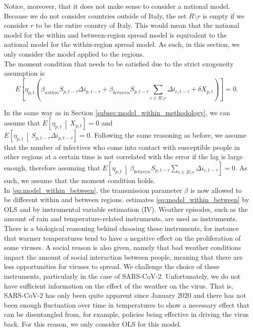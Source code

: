 \documentclass[12pt]{article}
\begin{document}
	Notice, moreover, that it does not make sense to consider a national model. Because we do not consider countries outside of Italy, the set $R \setminus r$ is empty if we consider $r$ to be the entire country of Italy. This would mean that the national model for the within and between-region spread model is equivalent to the national model for the within-region spread model. As such, in this section, we only consider the model applied to the regions. \\
	
	The moment condition that needs to be satisfied due to the strict exogeneity assumption is
	    \[E\left[ \eta_{p,t} \left( \beta_{within} S_{p,t-\tau} \Delta i_{p,t-\tau}  + \beta_{between}S_{p,t-\tau} \sum_{c \in R \setminus r} \Delta i_{c, t-\tau} + \delta X_{p,t} \right) \right] = 0.\]
	    
	In the same way as in Section \ref{subsec:model_within_methodology}, we can assume that $E\left[\eta_{p,t} \,\middle|\, X_{p,t}\right] = 0$ and \\
	$E\left[\eta_{p,t} \,\middle|\, S_{p,t-\tau} \Delta i_{p,t-\tau}\right] = 0$. Following the same reasoning as before, we assume that the number of infectives who come into contact with susceptible people in other regions at a certain time is not correlated with the error if the lag is large enough, therefore assuming that $E\left[\eta_{p,t} \,\middle|\, \beta_{between}S_{p,t-\tau} \sum_{c \in R \setminus r} \Delta i_{c, t-\tau}\right] = 0$. As such, we assume that the moment condition holds. \\
	
	In \eqref{eq:model_within_between}, the transmission parameter $\beta$ is now allowed to be different within and between regions. \textcite{adda2016economic} estimates \eqref{eq:model_within_between} by OLS and by instrumental variable estimation (IV). Weather episodes, such as the amount of rain and temperature-related instruments, are used as instruments. There is a biological reasoning behind choosing these instruments, for instance that warmer temperatures tend to have a negative effect on the proliferation of some viruses. A social reason is also given, namely that bad weather conditions impact the amount of social interaction between people, meaning that there are less opportunities for viruses to spread. We challenge the choice of these instruments, particularly in the case of SARS-CoV-2. Unfortunately, we do not have sufficient information on the effect of the weather on the virus. That is, SARS-CoV-2 has only been quite apparent since January 2020 and there has not been enough fluctuation over time in temperatures to show a necessary effect that can be disentangled from, for example, policies being effective in driving the virus back. For this reason, we only consider OLS for this model.
	
\end{document}

